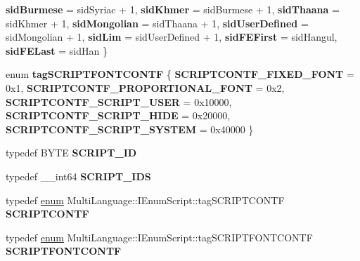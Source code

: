 \begin{DoxyCompactItemize}
{\bfseries sid\+Burmese} = sid\+Syriac + 1, 
{\bfseries sid\+Khmer} = sid\+Burmese + 1, 
{\bfseries sid\+Thaana} = sid\+Khmer + 1, 
{\bfseries sid\+Mongolian} = sid\+Thaana + 1, 
\newline
{\bfseries sid\+User\+Defined} = sid\+Mongolian + 1, 
{\bfseries sid\+Lim} = sid\+User\+Defined + 1, 
{\bfseries sid\+F\+E\+First} = sid\+Hangul, 
{\bfseries sid\+F\+E\+Last} = sid\+Han
 \}
\item 
\mbox{\label{interface_multi_language_1_1_i_enum_script_a33ce4e53b93b73775baadd8cf787e8e1}} 
enum {\bfseries tag\+S\+C\+R\+I\+P\+T\+F\+O\+N\+T\+C\+O\+N\+TF} \{ \newline
{\bfseries S\+C\+R\+I\+P\+T\+C\+O\+N\+T\+F\+\_\+\+F\+I\+X\+E\+D\+\_\+\+F\+O\+NT} = 0x1, 
{\bfseries S\+C\+R\+I\+P\+T\+C\+O\+N\+T\+F\+\_\+\+P\+R\+O\+P\+O\+R\+T\+I\+O\+N\+A\+L\+\_\+\+F\+O\+NT} = 0x2, 
{\bfseries S\+C\+R\+I\+P\+T\+C\+O\+N\+T\+F\+\_\+\+S\+C\+R\+I\+P\+T\+\_\+\+U\+S\+ER} = 0x10000, 
{\bfseries S\+C\+R\+I\+P\+T\+C\+O\+N\+T\+F\+\_\+\+S\+C\+R\+I\+P\+T\+\_\+\+H\+I\+DE} = 0x20000, 
\newline
{\bfseries S\+C\+R\+I\+P\+T\+C\+O\+N\+T\+F\+\_\+\+S\+C\+R\+I\+P\+T\+\_\+\+S\+Y\+S\+T\+EM} = 0x40000
 \}
\item 
\mbox{\label{interface_multi_language_1_1_i_enum_script_ac98804af96bbf434cf4d8765ce88e55d}} 
typedef B\+Y\+TE {\bfseries S\+C\+R\+I\+P\+T\+\_\+\+ID}
\item 
\mbox{\label{interface_multi_language_1_1_i_enum_script_a634c03a0a36582b33d557e3b7621a6fb}} 
typedef \+\_\+\+\_\+int64 {\bfseries S\+C\+R\+I\+P\+T\+\_\+\+I\+DS}
\item 
\mbox{\label{interface_multi_language_1_1_i_enum_script_a0b76bb1c231d27ece23ddf1c373c81f1}} 
typedef \hyperlink{interfaceenum}{enum} Multi\+Language\+::\+I\+Enum\+Script\+::tag\+S\+C\+R\+I\+P\+T\+C\+O\+N\+TF {\bfseries S\+C\+R\+I\+P\+T\+C\+O\+N\+TF}
\item 
\mbox{\label{interface_multi_language_1_1_i_enum_script_a641f04eef5c7b7f971b0027ac7138007}} 
typedef \hyperlink{interfaceenum}{enum} Multi\+Language\+::\+I\+Enum\+Script\+::tag\+S\+C\+R\+I\+P\+T\+F\+O\+N\+T\+C\+O\+N\+TF {\bfseries S\+C\+R\+I\+P\+T\+F\+O\+N\+T\+C\+O\+N\+TF}

\end{DoxyCompactItemize}

